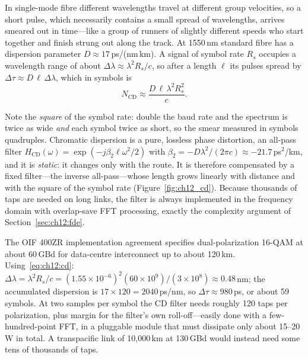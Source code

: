 In single-mode fibre different wavelengths travel at different group velocities, so a short pulse,
which necessarily contains a small spread of wavelengths, arrives smeared out in time---like a
group of runners of slightly different speeds who start together and finish strung out along the
track. At 1550\,nm standard fibre has a dispersion parameter $D\approx17$\,ps/(nm\,km). A signal of
symbol rate $R_s$ occupies a wavelength range of about $\Delta\lambda\approx\lambda^2R_s/c$, so after
a length $\ell$ its pulses spread by $\Delta\tau\approx D\,\ell\,\Delta\lambda$, which in symbols is
\begin{equation}
N_{\mathrm{CD}}\approx\frac{D\,\ell\,\lambda^2R_s^2}{c}.
\label{eq:ch12:cd}
\end{equation}

Note the \emph{square} of the symbol rate: double the baud rate and the spectrum is twice as wide
\emph{and} each symbol twice as short, so the smear measured in symbols quadruples. Chromatic
dispersion is a pure, lossless phase distortion, an all-pass filter
$H_{\mathrm{CD}}(\omega)=\exp(-j\beta_2\ell\omega^2/2)$ with $\beta_2=-D\lambda^2/(2\pi c)\approx-21.7$\,ps$^2$/km,
and it is \emph{static}: it changes only with the route. It is therefore compensated by a fixed
filter---the inverse all-pass---whose length grows linearly with distance and with the square of the
symbol rate (Figure~\ref{fig:ch12_cd}). Because thousands of taps are needed on long links, the
filter is always implemented in the frequency domain with overlap-save FFT processing, exactly the
complexity argument of Section~\ref{sec:ch12:fde}.

\begin{worked}
The OIF 400ZR implementation agreement specifies dual-polarization 16-QAM at about 60\,GBd for
data-centre interconnect up to about 120\,km. Using~\eqref{eq:ch12:cd}:
$\Delta\lambda=\lambda^2R_s/c=(1.55\times10^{-6})^2(60\times10^9)/(3\times10^8)\approx0.48$\,nm; the
accumulated dispersion is $17\times120=2040$\,ps/nm, so $\Delta\tau\approx980$\,ps, or about 59 symbols.
At two samples per symbol the CD filter needs roughly 120 taps per polarization, plus margin for the
filter's own roll-off---easily done with a few-hundred-point FFT, in a pluggable module that must
dissipate only about 15--20\,W in total. A transpacific link of 10{,}000\,km at 130\,GBd would instead need
some tens of thousands of taps.
\end{worked}

